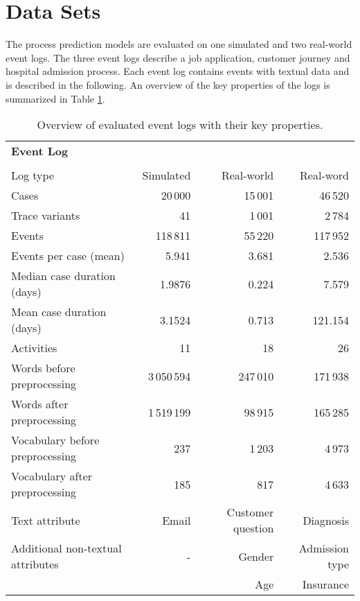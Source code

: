 \section{Data Sets}

The process prediction models are evaluated on one simulated and two real-world event logs.
The three event logs describe a job application, customer journey and hospital admission process.
Each event log contains events with textual data and is described in the following.
An overview of the key properties of the logs is summarized in Table \ref{tab:logs}.

\begin{table}[!htbp]
	\begin{tabularx}{\textwidth}{l r r r}
		\toprule
		\textbf{Event Log} & \heading{\textbf{Job}} & \heading{\textbf{Customer}} &\heading{\textbf{Hospital}}  \\
		& \heading{\textbf{Application}} & \heading{\textbf{Journey}} &\heading{\textbf{Admission}}  \\
		\midrule
		Log type & Simulated & Real-world & Real-word\\
		Cases & 20\,000& 15\,001& 46\,520\\
		Trace variants &41 & 1\,001 &2\,784 \\
		Events & 118\,811 & 55\,220 & 117\,952\\
		Events per case (mean) & 5.941& 3.681& 2.536\\
		Median case duration (days) & 1.9876 & 0.224& 7.579\\
		Mean case duration (days)& 3.1524 &  0.713 & 121.154\\
		Activities & 11 & 18 & 26\\
		Words before preprocessing & 3\,050\,594 &247\,010 &  171\,938\\
		Words after preprocessing  &1\,519\,199 &98\,915 & 165\,285\\
		Vocabulary before preprocessing & 237 & 1\,203 & 4\,973 \\
		Vocabulary after preprocessing & 185 & 817 & 4\,633\\
		Text attribute & Email& Customer question & Diagnosis\\
		Additional non-textual attributes & - & Gender& Admission type\\
		&  & Age& Insurance\\
		\bottomrule
	\end{tabularx}
	\caption[Overview of evaluated event logs]{Overview of evaluated event logs with their key properties.}
	\label{tab:logs}
\end{table}

